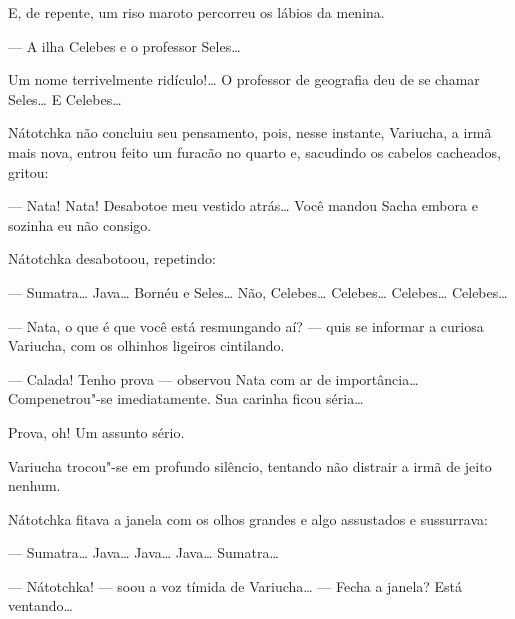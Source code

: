 E, de repente, um riso maroto percorreu os lábios da menina.

--- A ilha Celebes e o professor Seles\ldots{}

Um nome terrivelmente ridículo!\ldots{} O professor de geografia deu de se
chamar Seles\ldots{} E Celebes\ldots{}

Nátotchka não concluiu seu pensamento, pois, nesse instante, Variucha, a
irmã mais nova, entrou feito um furacão no quarto e, sacudindo os
cabelos cacheados, gritou:

--- Nata! Nata! Desabotoe meu vestido atrás\ldots{} Você mandou Sacha embora
e sozinha eu não consigo.

Nátotchka desabotoou, repetindo:

--- Sumatra\ldots{} Java\ldots{} Bornéu e Seles\ldots{} Não, Celebes\ldots{} Celebes\ldots{}
Celebes\ldots{} Celebes\ldots{}

--- Nata, o que é que você está resmungando aí? --- quis se informar a
curiosa Variucha, com os olhinhos ligeiros cintilando.

--- Calada! Tenho prova --- observou Nata com ar de importância\ldots{}
Compenetrou"-se imediatamente. Sua carinha ficou séria\ldots{}

Prova, oh! Um assunto sério.

Variucha trocou"-se em profundo silêncio, tentando não distrair a irmã de
jeito nenhum.

Nátotchka fitava a janela com os olhos grandes e algo assustados e
sussurrava:

--- Sumatra\ldots{} Java\ldots{} Java\ldots{} Java\ldots{} Sumatra\ldots{}

--- Nátotchka! --- soou a voz tímida de Variucha\ldots{} --- Fecha a janela?
Está ventando\ldots{}

